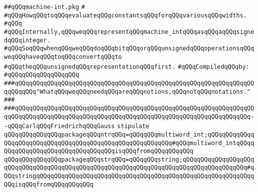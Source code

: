 \label{src/lib/compiler/back/low/treecode/machine-int.pkg}
\verb|##qQQqmachine-int.pkg|\newline
\verb|#|\newline
\verb|#qQQqHowqQQqtoqQQqevaluateqQQqconstantsqQQqforqQQqvariousqQQqwidths.|\newline
\verb|#qQQq|\newline
\verb|#qQQqInternally,qQQqweqQQqrepresentqQQqmachine_intqQQqasqQQqaqQQqsignedqQQqinteger.|\newline
\verb|#qQQqSoqQQqwhenqQQqweqQQqdoqQQqbitqQQqorqQQqunsignedqQQqoperationsqQQqweqQQqhaveqQQqtoqQQqconvertqQQqto|\newline
\verb|#qQQqtheqQQqunsignedqQQqrepresentationqQQqfirst.|\newline
\newline
\verb|#qQQqCompiledqQQqby:|\newline
\verb|#qQQqqQQqqQQqqQQqqQQq|\newline
\newline
\newline
\newline
\verb|###qQQqqQQqqQQqqQQqqQQqqQQqqQQqqQQqqQQqqQQqqQQqqQQqqQQqqQQqqQQqqQQqqQQqqQQqqQQq"WhatqQQqweqQQqneedqQQqareqQQqnotions,qQQqnotqQQqnotations."|\newline
\verb|###|\newline
\verb|###qQQqqQQqqQQqqQQqqQQqqQQqqQQqqQQqqQQqqQQqqQQqqQQqqQQqqQQqqQQqqQQqqQQqqQQqqQQqqQQqqQQqqQQqqQQqqQQqqQQqqQQqqQQqqQQqqQQqqQQqqQQqqQQqqQQqqQQq--qQQqCarlqQQqFriedrichqQQqGauss|\newline
\newline
\newline
\newline
\verb|stipulate|\newline
\verb|qQQqqQQqqQQqqQQqpackageqQQqntrqQQq=qQQqqQQqmultiword_int;qQQqqQQqqQQqqQQqqQQqqQQqqQQqqQQqqQQqqQQqqQQqqQQqqQQqqQQqqQQq#qQQqmultiword_intqQQqqQQqqQQqqQQqqQQqqQQqqQQqqQQqqQQqisqQQqfromqQQqqQQqqQQq|\newline
\verb|qQQqqQQqqQQqqQQqpackageqQQqstrqQQq=qQQqqQQqstring;qQQqqQQqqQQqqQQqqQQqqQQqqQQqqQQqqQQqqQQqqQQqqQQqqQQqqQQqqQQqqQQqqQQqqQQqqQQqqQQqqQQqqQQq#qQQqstringqQQqqQQqqQQqqQQqqQQqqQQqqQQqqQQqqQQqqQQqqQQqqQQqqQQqqQQqqQQqqQQqisqQQqfromqQQqqQQqqQQq|\newline
